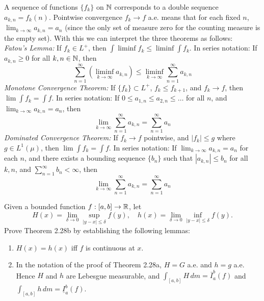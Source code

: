 \documentclass[12pt,a4paper]{article}
\begin{document}
\begin{solution}
    A sequence of functions $\{f_k\}$ on $\mathbb{N}$ corresponds to a double sequence $a_{k,n} = f_k(n)$. Pointwise convergence $f_k \to f$ a.e. means that for each fixed $n$, $\lim_{k\to\infty} a_{k,n} = a_n$ (since the only set of measure zero for the counting measure is the empty set).
With this we can interpret the three theorems as follows: \\
\textit{Fatou's Lemma:} If $f_k \in L^+$, then $\int \liminf f_k \le \liminf \int f_k$.
In series notation: If $a_{k,n} \ge 0$ for all $k,n \in \mathbb{N}$, then
$$\sum_{n=1}^\infty \left( \liminf_{k\to\infty} a_{k,n} \right) \le \liminf_{k\to\infty} \sum_{n=1}^\infty a_{k,n}$$
\textit{Monotone Convergence Theorem:} If $\{f_k\} \subset L^+$, $f_k \le f_{k+1}$, and $f_k \to f$, then $\lim \int f_k = \int f$.
In series notation: If $0 \le a_{1,n} \le a_{2,n} \le \dots$ for all $n$, and $\lim_{k\to\infty} a_{k,n} = a_n$, then
$$\lim_{k\to\infty} \sum_{n=1}^\infty a_{k,n}=\sum_{n=1}^\infty a_n$$
\textit{Dominated Convergence Theorem:} If $f_k \to f$ pointwise, and $|f_k| \le g$ where $g \in L^1(\mu)$, then $\lim \int f_k = \int f$.
In series notation: If $\lim_{k\to\infty} a_{k,n} = a_n$ for each $n$, and there exists a bounding sequence $\{b_n\}$ such that $|a_{k,n}| \le b_n$ for all $k,n$, and $\sum_{n=1}^\infty b_n < \infty$, then
$$\lim_{k\to\infty} \sum_{n=1}^\infty a_{k,n}=\sum_{n=1}^\infty a_n$$
\end{solution}
\begin{problem}\label{prob:2-23}
Given a bounded function $f: [a, b] \to \mathbb{R}$, let
\[ H(x) = \lim_{\delta \to 0} \sup_{|y-x|\le\delta} f(y), \quad h(x) = \lim_{\delta \to 0} \inf_{|y-x|\le\delta} f(y). \]
Prove Theorem 2.28b by establishing the following lemmas:
\begin{enumerate}[label=\alph*.]
    \item $H(x) = h(x)$ iff $f$ is continuous at $x$.
    \item In the notation of the proof of Theorem 2.28a, $H = G$ a.e. and $h = g$ a.e. Hence $H$ and $h$ are Lebesgue measurable, and $\int_{[a, b]} H \, dm = \overline{I}_a^b(f)$ and $\int_{[a, b]} h \, dm = \underline{I}_a^b(f)$.
\end{enumerate}
\end{problem}
\end{document}
